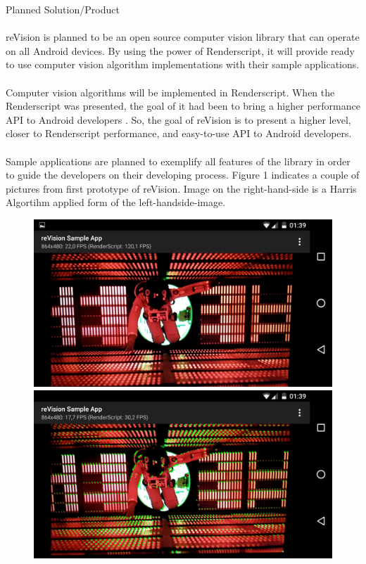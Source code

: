 \documentclass[12pt, a4paper]{article} \pagenumbering{gobble}
\begin{document}
\begin{section}{Planned Solution/Product}
  \paragraph{}{
  reVision is planned to be an open source computer vision library that can operate on all Android devices.
  By using the power of Renderscript, it will provide ready to use computer vision algorithm implementations
  with their sample applications.
  }
  \paragraph{}{
  Computer vision algorithms will be implemented in Renderscript. When the Renderscript was presented, the goal of
  it had been to bring a higher performance API to Android developers \cite{renderscript_release}.
  So, the goal of reVision is to present a higher level, closer to Renderscript performance, and easy-to-use
  API to Android developers.
  }
  \paragraph{}{
  Sample applications are planned to exemplify all features of the library in order to guide the developers on
  their developing process. Figure 1 indicates a couple of pictures from first prototype of reVision. Image on the
  right-hand-side is a Harris Algortihm applied form of the left-handside-image.

  }
  \begin{figure}[h]
    \centering
    \includegraphics[scale=0.17]{clean.png}
    \includegraphics[scale=0.17]{detected.png}


\end{figure}
\end{section}
\end{document}
